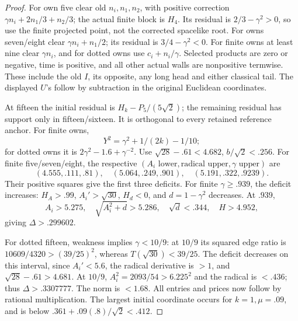 \documentclass[11pt]{article}
\theoremstyle{definition}
\theoremstyle{remark}
\begin{document}
\begin{proof}
For own five clear old \(n_i,n_1,n_2\), with positive correction
\(\gamma n_i+2n_1/3+n_2/3\); the actual finite block is \(H_4\).
Its residual is \(2/3-\gamma^2>0\), so use the finite projected
point, not the corrected spacelike root. For owns seven/eight clear
\(\gamma n_i+n_1/2\); its residual is \(3/4-\gamma^2<0\).
For finite owns at least nine clear \(\gamma n_i\), and for dotted
owns use \(c_i+n_i/\gamma\). Selected products are zero or negative,
time is positive, and all other actual walls are nonpositive termwise.
These include the old \(I\), its opposite, any long head and either
classical tail. The displayed \(U\)'s follow by subtraction in the
original Euclidean coordinates.

At fifteen the initial residual is
\(H_k-P_5/(5\sqrt2)\); the remaining residual has support only in
fifteen/sixteen. It is orthogonal to every retained reference anchor.
For finite owns,
\[
 Y^2=\gamma^2+1/(2k)-1/10;
\]
for dotted owns it is \(2\gamma^2-1.6+\gamma^{-2}\).
Use \(\sqrt{28}-.61<4.682\), \(b/\sqrt2<.256\).
For finite five/seven/eight, the respective
\((A_i\text{ lower},\text{radical upper},\gamma\text{ upper})\)
are
\[
 (4.555,.111,.81),\quad(5.064,.249,.901),\quad
 (5.191,.322,.9239).
\]
Their positive squares give the first three deficits.
For finite \(\gamma\ge.939\), the deficit increases:
\(H_A>.99\), \(A_i'>\sqrt{30}\), \(H_d<0\), and
\(d=1-\gamma^2\) decreases. At \(.939\),
\[
 A_i>5.275,\quad\sqrt{A_i^2+d}>5.286,\quad\sqrt d<.344,
 \quad H>4.952,
\]
giving \(\Delta>.299602\).

For dotted fifteen, weakness implies \(\gamma<10/9\):
at \(10/9\) its squared edge ratio is
\(10609/4320>(39/25)^2\), whereas \(T(\sqrt{30})<39/25\).
The deficit decreases on this interval, since
\(A_i'<5.6\), the radical derivative is \(>1\), and
\(\sqrt{28}-.61>4.681\). At \(10/9\),
\(A_i^2=2093/54>6.225^2\) and the radical is \(<.436\);
thus \(\Delta>.3307777\). The norm is \(<1.68\).
All entries and prices now follow by rational multiplication.
The largest initial coordinate occurs for \(k=1,\mu=.09\),
and is below \(.361+.09(.8)/\sqrt2<.412\).
\end{proof}
\end{document}
